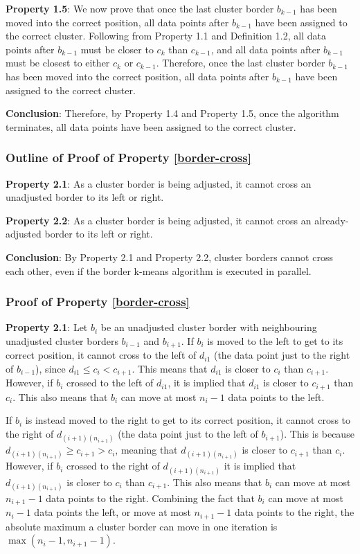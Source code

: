 \documentclass[conference,compsoc]{IEEEtran}
\begin{document}
\textbf{Property 1.5}: We now prove that once the last cluster border $b_{k-1}$ has been moved into the correct position, all data points after $b_{k-1}$ have been assigned to the correct cluster. Following from Property 1.1 and Definition 1.2, all data points after $b_{k-1}$ must be closer to $c_k$ than $c_{k-1}$, and all data points after $b_{k-1}$ must be closest to either $c_k$ or $c_{k-1}$. Therefore, once the last cluster border $b_{k-1}$ has been moved into the correct position, all data points after $b_{k-1}$ have been assigned to the correct cluster.

\textbf{Conclusion}: Therefore, by Property 1.4 and Property 1.5, once the algorithm terminates, all data points have been assigned to the correct cluster.


\subsubsection{Outline of Proof of Property \ref{border-cross}}

\textbf{Property 2.1}: As a cluster border is being adjusted, it cannot cross an unadjusted border to its left or right.

\textbf{Property 2.2}: As a cluster border is being adjusted, it cannot cross an already-adjusted border to its left or right.

\textbf{Conclusion}: By Property 2.1 and Property 2.2, cluster borders cannot cross each other, even if the border k-means algorithm is executed in parallel.

\subsubsection{Proof of Property \ref{border-cross}}

\textbf{Property 2.1}: Let $b_i$ be an unadjusted cluster border with neighbouring unadjusted cluster borders $b_{i-1}$ and $b_{i+1}$. If $b_i$ is moved to the left to get to its correct position, it cannot cross to the left of $d_{i1}$ (the data point just to the right of $b_{i-1}$), since $d_{i1} \leq c_i < c_{i+1}$. This means that $d_{i1}$ is closer to $c_i$ than $c_{i+1}$. However, if $b_i$ crossed to the left of $d_{i1}$, it is implied that $d_{i1}$ is closer to $c_{i+1}$ than $c_i$. This also means that $b_i$ can move at most $n_{i}-1$ data points to the left.

If $b_i$ is instead moved to the right to get to its correct position, it cannot cross to the right of $d_{(i+1)(n_{i+1})}$ (the data point just to the left of $b_{i+1}$). This is because $d_{(i+1)(n_{i+1})} \geq c_{i+1} > c_i$, meaning that $d_{(i+1)(n_{i+1})}$ is closer to $c_{i+1}$ than $c_i$. However, if $b_i$ crossed to the right of $d_{(i+1)(n_{i+1})}$ it is implied that $d_{(i+1)(n_{i+1})}$ is closer to $c_i$ than $c_{i+1}$. This also means that $b_i$ can move at most $n_{i+1}-1$ data points to the right. Combining the fact that $b_i$ can move at most $n_{i}-1$ data points the left, or move at most $n_{i+1}-1$ data points to the right, the absolute maximum a cluster border can move in one iteration is $\max(n_{i}-1, n_{i+1}-1)$.
\end{document}
